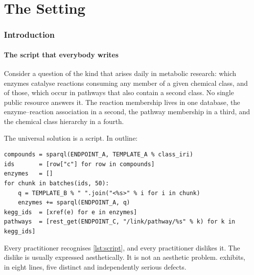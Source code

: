 \part{The Setting}

\section{Introduction}
\label{sec:intro}

\subsection{The script that everybody writes}

Consider a question of the kind that arises daily in metabolic research: which
enzymes catalyse reactions consuming any member of a given chemical class, and
of those, which occur in pathways that also contain a second class. No single
public resource answers it. The reaction membership lives in one database, the
enzyme--reaction association in a second, the pathway membership in a third,
and the chemical class hierarchy in a fourth.

The universal solution is a script. In outline:

\begin{lstlisting}[caption={The script everybody writes. Not a strawman.},label=lst:script]
compounds = sparql(ENDPOINT_A, TEMPLATE_A % class_iri)
ids       = [row["c"] for row in compounds]
enzymes   = []
for chunk in batches(ids, 50):
    q = TEMPLATE_B % " ".join("<%s>" % i for i in chunk)
    enzymes += sparql(ENDPOINT_A, q)
kegg_ids  = [xref(e) for e in enzymes]
pathways  = [rest_get(ENDPOINT_C, "/link/pathway/%s" % k) for k in kegg_ids]
\end{lstlisting}

Every practitioner recognises \cref{lst:script}, and every practitioner
dislikes it. The dislike is usually expressed aesthetically. It is not an
aesthetic problem.  exhibits, in eight lines, five distinct
and independently serious defects.

